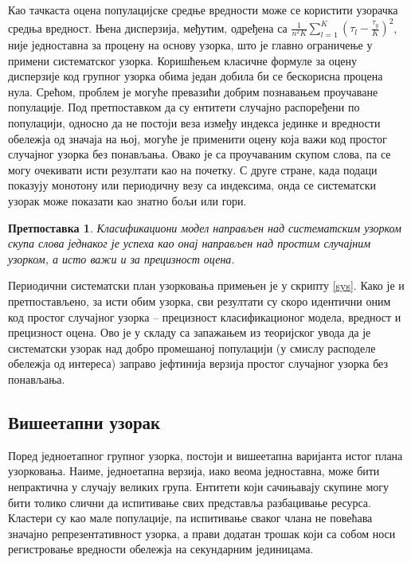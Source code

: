 \documentclass[a4paper]{article}
\newtheorem{hipoteza}{Претпоставка}
\begin{document}
Као тачкаста оцена популацијске средње вредности може се користити узорачка средња вредност. Њена дисперзија, међутим, одређена са $\frac{1}{n^2K} \sum_{l=1}^K (\tau_l - \frac{\tau_y}{K})^2$, није једноставна за процену на основу узорка, што је главно ограничење у примени систематског узорка. Коришћењем класичне формуле за оцену дисперзије код групног узорка обима један добила би се бескорисна процена нула. Срећом, проблем је могуће превазићи добрим познавањем проучаване популације. Под претпоставком да су ентитети случајно распоређени по популацији, односно да не постоји веза између индекса јединке и вредности обележја од значаја на њој, могуће је применити оцену која важи код простог случајног узорка без понављања. Овако је са проучаваним скупом слова, па се могу очекивати исти резултати као на почетку. С друге стране, када подаци показују монотону или периодичну везу са индексима, онда се систематски узорак може показати као знатно бољи или гори.

\begin{hipoteza}
Класификациони модел направљен над систематским узорком скупа слова једнаког је успеха као онај направљен над простим случајним узорком, а исто важи и за прецизност оцена.
\end{hipoteza}

Периодични систематски план узорковања примењен је у скрипту \ref{sys}. Како је и претпостављено, за исти обим узорка, сви резултати су скоро идентични оним код простог случајног узорка -- прецизност класификационог модела, вредност и прецизност оцена. Ово је у складу са запажањем из теоријског увода да је систематски узорак над добро промешаној популацији (у смислу расподеле обележја од интереса) заправо јефтинија верзија простог случајног узорка без понављања.



\subsection{Вишеетапни узорак}

Поред једноетапног групног узорка, постоји и вишеетапна варијанта истог плана узорковања.\cite{prez10} Наиме, једноетапна верзија, иако веома једноставна, може бити непрактична у случају великих група. Ентитети који сачињавају скупине могу бити толико слични да испитивање свих представља разбацивање ресурса. Кластери су као мале популације, па испитивање сваког члана не повећава значајно репрезентативност узорка, а прави додатан трошак који са собом носи регистровање вредности обележја на секундарним јединицама.
\end{document}
